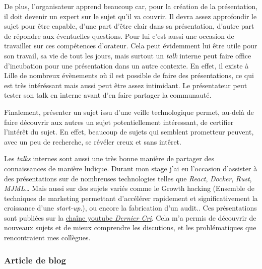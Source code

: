 \documentclass[12pt,a4paper]{article}
\begin{document}
  \bigskip

  De plus, l'organisateur apprend beaucoup car, pour la création de la
  présentation, il doit devenir un expert sur le sujet qu'il va couvrir.
  Il devra assez approfondir le sujet pour être capable, d'une part d'être
  clair dans sa présentation, d'autre part de répondre aux éventuelles
  questions. Pour lui c'est aussi une occasion de travailler sur ces
  compétences d'orateur. Cela peut évidemment lui être utile pour son
  travail, sa vie de tout les jours, mais surtout un \emph{talk} interne
  peut faire office d'incubation pour une présentation dans un autre
  contexte. En effet, il existe à Lille de nombreux évènements où il est
  possible de faire des présentations, ce qui est très intéréssant mais
  aussi peut être assez intimidant. Le présentateur peut tester son talk
  en interne avant d'en faire partager la communauté.

  \bigskip

  Finalement, présenter un sujet issu d'une veille technologique permet,
  au-delà de faire découvrir aux autres un sujet potentiellement
  intéressant, de certifier l'intérêt du sujet. En effet, beaucoup de
  sujets qui semblent prometteur peuvent, avec un peu de recherche, se
  révéler creux et sans intêret.

  \bigskip

  Les \emph{talks} internes sont aussi une très bonne manière de partager
  des connaissances de manière ludique. Durant mon stage j'ai eu
  l'occasion d'assister à des présentations sur de nombreuses technologies
  telles que \emph{React}, \emph{Docker}, \emph{Rust}, \emph{MJML}\ldots{}
  Mais aussi sur des sujets variés comme le Growth hacking (Ensemble de
  techniques de marketing permettant d'accélérer rapidement et
  significativement la croissance d'une \emph{start-up}.), ou encore la
  fabrication d'un audit.. Ces présentations sont publiées sur la
  \href{https://www.youtube.com/channel/UCDfdBlzldhg_PEu3xZTPsHg}{chaîne
  youtube \emph{Dernier Cri}}. Cela m'a permis de découvrir de nouveaux
  sujets et de mieux comprendre les discutions, et les problématiques que
  rencontraient mes collègues.

  \bigskip

  \subsubsection{Article de blog}\label{article-de-blog}

  \bigskip
\end{document}
